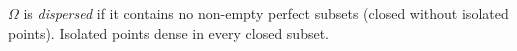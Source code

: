 $\Omega$ is \emph{dispersed} if it contains no non-empty perfect subsets (closed without isolated points). Isolated points dense in every closed subset.
